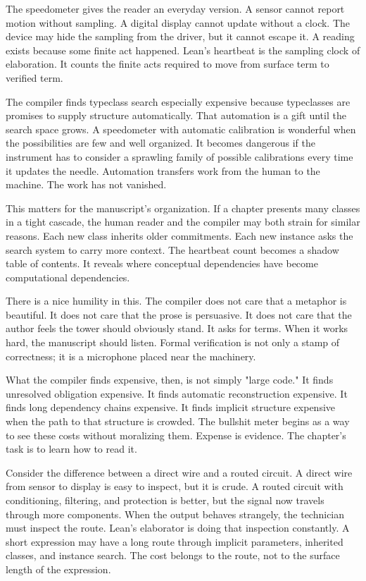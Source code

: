 The speedometer gives the reader an everyday version. A sensor cannot report
motion without sampling. A digital display cannot update without a clock. The
device may hide the sampling from the driver, but it cannot escape it. A
reading exists because some finite act happened. Lean's heartbeat is the
sampling clock of elaboration. It counts the finite acts required to move from
surface term to verified term.

The compiler finds typeclass search especially expensive because typeclasses
are promises to supply structure automatically. That automation is a gift until
the search space grows. A speedometer with automatic calibration is wonderful
when the possibilities are few and well organized. It becomes dangerous if the
instrument has to consider a sprawling family of possible calibrations every
time it updates the needle. Automation transfers work from the human to the
machine. The work has not vanished.

This matters for the manuscript's organization. If a chapter presents many
classes in a tight cascade, the human reader and the compiler may both strain
for similar reasons. Each new class inherits older commitments. Each new
instance asks the search system to carry more context. The heartbeat count
becomes a shadow table of contents. It reveals where conceptual dependencies
have become computational dependencies.

There is a nice humility in this. The compiler does not care that a metaphor is
beautiful. It does not care that the prose is persuasive. It does not care that
the author feels the tower should obviously stand. It asks for terms. When it
works hard, the manuscript should listen. Formal verification is not only a
stamp of correctness; it is a microphone placed near the machinery.

What the compiler finds expensive, then, is not simply "large code." It finds
unresolved obligation expensive. It finds automatic reconstruction expensive.
It finds long dependency chains expensive. It finds implicit structure
expensive when the path to that structure is crowded. The bullshit meter begins
as a way to see these costs without moralizing them. Expense is evidence. The
chapter's task is to learn how to read it.

Consider the difference between a direct wire and a routed circuit. A direct
wire from sensor to display is easy to inspect, but it is crude. A routed
circuit with conditioning, filtering, and protection is better, but the signal
now travels through more components. When the output behaves strangely, the
technician must inspect the route. Lean's elaborator is doing that inspection
constantly. A short expression may have a long route through implicit
parameters, inherited classes, and instance search. The cost belongs to the
route, not to the surface length of the expression.

